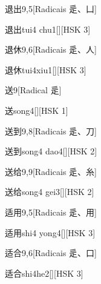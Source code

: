 \begin{entry}{退出}{9,5}[Radicais ⾡、⼐]
  \begin{phonetics}{退出}{tui4 chu1}[][HSK 3]
  \end{phonetics}
\end{entry}

\begin{entry}{退休}{9,6}[Radicais ⾡、⼈]
  \begin{phonetics}{退休}{tui4xiu1}[][HSK 3]
  \end{phonetics}
\end{entry}

\begin{entry}{送}{9}[Radical ⾡]
  \begin{phonetics}{送}{song4}[][HSK 1]
  \end{phonetics}
\end{entry}

\begin{entry}{送到}{9,8}[Radicais ⾡、⼑]
  \begin{phonetics}{送到}{song4 dao4}[][HSK 2]
  \end{phonetics}
\end{entry}

\begin{entry}{送给}{9,9}[Radicais ⾡、⽷]
  \begin{phonetics}{送给}{song4 gei3}[][HSK 2]
  \end{phonetics}
\end{entry}

\begin{entry}{适用}{9,5}[Radicais ⾡、⽤]
  \begin{phonetics}{适用}{shi4 yong4}[][HSK 3]
  \end{phonetics}
\end{entry}

\begin{entry}{适合}{9,6}[Radicais ⾡、⼝]
  \begin{phonetics}{适合}{shi4he2}[][HSK 3]
  \end{phonetics}
\end{entry}

